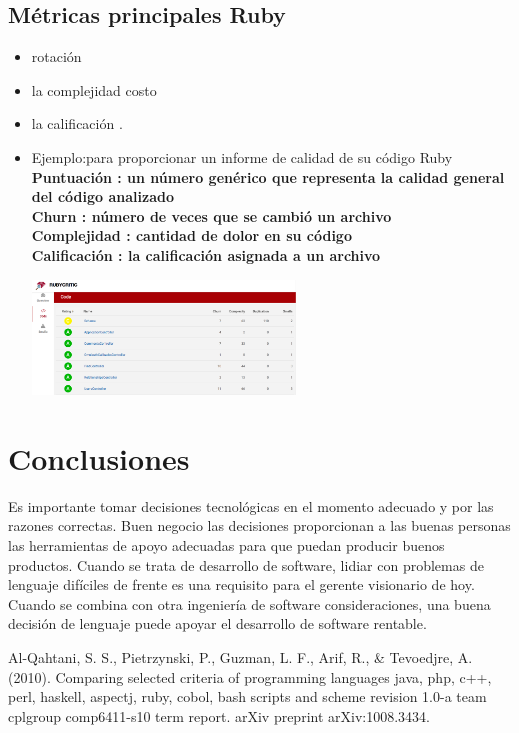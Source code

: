 \documentclass[twoside,twocolumn]{article}
\begin{document}
\subsection {Métricas principales Ruby}
\begin{itemize}
\item rotación 
\item la complejidad 
\itemel costo 
\item la calificación .
\item  Ejemplo:para proporcionar un informe de calidad de su código Ruby
\\ \textbf{ Puntuación : un número genérico que representa la calidad general del código analizado }
\\ \textbf{ Churn : número de veces que se cambió un archivo}
\\ \textbf{ Complejidad : cantidad de dolor en su código}
\\ \textbf{ Calificación : la calificación asignada a un archivo}
\begin{center}
	\includegraphics[width=7cm]{./Imagenes/rating} 
	\end{center}
\end{itemize}

\section{Conclusiones}
Es importante tomar decisiones tecnológicas en el momento adecuado y por las razones correctas. Buen negocio
las decisiones proporcionan a las buenas personas las herramientas de apoyo adecuadas para que puedan producir buenos productos.
Cuando se trata de desarrollo de software, lidiar con problemas de lenguaje difíciles de frente es una
requisito para el gerente visionario de hoy. Cuando se combina con otra ingeniería de software
consideraciones, una buena decisión de lenguaje puede apoyar el desarrollo de software rentable.



\begin{thebibliography}{99} %

 
\newblock Al-Qahtani, S. S., Pietrzynski, P., Guzman, L. F., Arif, R., & Tevoedjre, A. (2010). Comparing selected criteria of programming languages java, php, c++, perl, haskell, aspectj, ruby, cobol, bash scripts and scheme revision 1.0-a team cplgroup comp6411-s10 term report. arXiv preprint arXiv:1008.3434.
\end{thebibliography}

\end{document}
